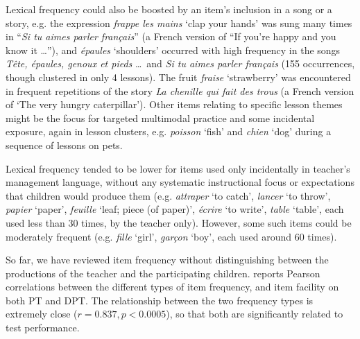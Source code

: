 \documentclass[output=paper]{langscibook}
\begin{document}
Lexical frequency could also be boosted by an item’s inclusion in a song or a story, e.g. the expression \textit{frappe les mains} `clap your hands' was sung many times in ``\textit{Si tu aimes parler français}'' (a French version of ``If you’re happy and you know it \ldots''), and \textit{épaules} `shoulders' occurred with high frequency in the songs \textit{Tête, épaules, genoux et pieds} \ldots\ and \textit{Si tu aimes parler français} (155 occurrences, though clustered in only 4 lessons). The fruit \textit{fraise} `strawberry' was encountered in frequent repetitions of the story \textit{La chenille qui fait des trous} (a French version of `The very hungry caterpillar'). Other items relating to specific lesson themes might be the focus for targeted multimodal practice and some incidental exposure, again in lesson clusters, e.g. \textit{poisson} `fish' and \textit{chien} `dog' during a sequence of lessons on pets.\largerpage

\begin{sloppypar}
Lexical frequency tended to be lower for items used only incidentally in teacher’s management language, without any systematic instructional focus or expectations that children would produce them (e.g. \textit{attraper} `to catch', \textit{lancer} `to throw', \textit{papier} `paper', \textit{feuille} `leaf; piece (of paper)', \textit{écrire} `to write', \textit{table} `table', each used less than 30 times, by the teacher only). However, some such items could be moderately frequent (e.g. \textit{fille} `girl', \textit{garçon} `boy', each used around 60 times).
\end{sloppypar}

So far, we have reviewed item frequency without distinguishing between the productions of the teacher and the participating children.  reports Pearson correlations between the different types of item frequency, and item facility on both PT and DPT. The relationship between the two frequency types is extremely close ($r = 0.837, p < 0.0005$), so that both are significantly related to test performance.
\end{document}
